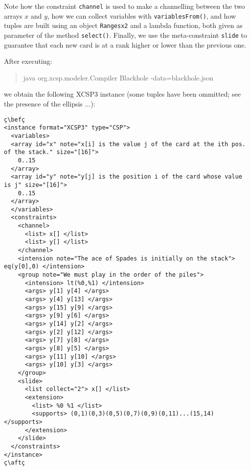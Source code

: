 \documentclass[10pt]{article}
\def\xt{{\rm XCSP3}\xspace}
\newcommand{\gb}[1]{{\tt #1}} %
\newcommand{\nn}[1]{{\tt #1}} %
\def\xt{{\rm XCSP3}\xspace}
\newenvironment{myvb}{\endgraf\small\verbatim}{\endverbatim}
\def\bef{\rule{10cm}{0.1mm}} %
\def\aft{\rule{10cm}{0.1mm}\medskip}
\begin{document}
Note how the constraint \gb{channel} is used to make a channelling between the two arrays $x$ and $y$,
how we can collect variables with \nn{variablesFrom()}, and how tuples are built using an object \nn{Rangesx2} and a lambda function, both given as parameter of the method \nn{select()}.
Finally, we use the meta-constraint \gb{slide} to guarantee that each new card is at a rank higher or lower than the previous one.


After executing:
\begin{quote}
\begin{myvb}
java org.xcsp.modeler.Compiler Blackhole -data=blackhole.json
\end{myvb}
\end{quote}
we obtain the following \xt instance (some tuples have been ommitted; see the presence of the ellipsis $\dots$):


\begin{lstlisting}
ç\befç
<instance format="XCSP3" type="CSP">
  <variables>
  <array id="x" note="x[i] is the value j of the card at the ith pos. of the stack." size="[16]">
    0..15
  </array>
  <array id="y" note="y[j] is the position i of the card whose value is j" size="[16]">
    0..15
  </array>
  </variables>
  <constraints>
    <channel>
      <list> x[] </list>
      <list> y[] </list>
    </channel>
    <intension note="The ace of Spades is initially on the stack"> eq(y[0],0) </intension>
    <group note="We must play in the order of the piles">
      <intension> lt(%0,%1) </intension>
      <args> y[1] y[4] </args>
      <args> y[4] y[13] </args>
      <args> y[15] y[9] </args>
      <args> y[9] y[6] </args>
      <args> y[14] y[2] </args>
      <args> y[2] y[12] </args>
      <args> y[7] y[8] </args>
      <args> y[8] y[5] </args>
      <args> y[11] y[10] </args>
      <args> y[10] y[3] </args>
    </group>
    <slide>
      <list collect="2"> x[] </list>
      <extension>
        <list> %0 %1 </list>
        <supports> (0,1)(0,3)(0,5)(0,7)(0,9)(0,11)...(15,14) </supports>
      </extension>
    </slide>
  </constraints>
</instance>
ç\aftç
\end{lstlisting}  

\end{document}
